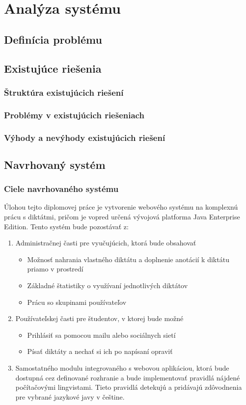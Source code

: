 \documentclass[12pt,oneside]{fithesis2}
\begin{document}
    \chapter{Analýza systému}
       \section{Definícia problému}
       \section{Existujúce riešenia}       
       		\subsection{Štruktúra existujúcich riešení}
       		\subsection{Problémy v existujúcich riešeniach}
       		\subsection{Výhody a nevýhody existujúcich riešení}
       \section{Navrhovaný systém}
       		\subsection{Ciele navrhovaného systému} \label{spec-app}
       		
Úlohou tejto diplomovej práce je vytvorenie webového systému na komplexnú prácu s diktátmi, pričom je vopred určená vývojová platforma Java Enterprise Edition. Tento systém bude pozostávať z:

\begin{enumerate}
\item Administračnej časti pre vyučujúcich, ktorá bude obsahovať
	\begin{itemize}
	\item Možnosť nahrania vlastného diktátu a doplnenie anotácií k diktátu priamo v prostredí
	\item Základné štatistiky o využívaní jednotlivých diktátov
	\item Prácu so skupinami používateľov
	\end{itemize}
\item Používateľskej časti pre študentov, v ktorej bude možné
	\begin{itemize}
	\item Prihlásiť sa pomocou mailu alebo sociálnych sietí
	\item Písať diktáty a nechať si ich po napísaní opraviť
	\end{itemize}
\item Samostatného modulu integrovaného s webovou aplikáciou, ktorá bude dostupná cez definované rozhranie a bude implementovať pravidlá nájdené počítačovými lingvistami. Tieto pravidlá detekujú a pridávajú zdôvodnenia pre vybrané jazykové javy v češtine.
\end{enumerate}
       		
\end{document}

